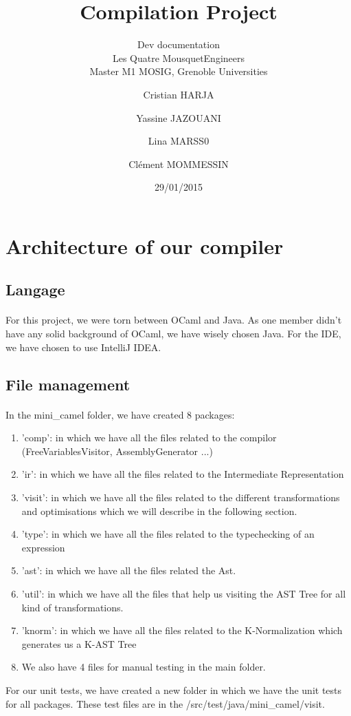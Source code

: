 \documentclass[a4paper,10pt]{article}
\title{Compilation Project}
\subtitle{Dev documentation\\ 
Les Quatre MousquetEngineers
\\Master M1 MOSIG, Grenoble Universities}
\author{Cristian HARJA \and Yassine JAZOUANI \and Lina MARSS0 
\and Cl\'{e}ment MOMMESSIN}
\date{29/01/2015}
\begin{document}


\maketitle


\section{Architecture of our compiler}
	\subsection{Langage}
		\paragraph{}
		For this project, we were torn between OCaml and Java. As one member
		didn't have any solid background of OCaml, we have wisely chosen 
		Java. For the IDE, we have chosen to use IntelliJ IDEA.
	\subsection{File management}
		\paragraph{}
		In the mini\_camel folder, we have created 8 packages:
		\begin{enumerate}
			\item 'comp': in which we have all the files related
			 to the compilor (FreeVariablesVisitor, AssemblyGenerator ...) 
			\item 'ir': in which we have all the files related to the
			 Intermediate Representation
			\item 'visit': in which we have all the files related to
			 the different transformations and optimisations which we will
			 describe in the following section. 
			\item 'type': in which we have all the files related to the
			 typechecking of an expression
			\item 'ast': in which we have all the files related the Ast.
			\item 'util': in which we have all the files that help us visiting
			the AST Tree for all kind of transformations.
			\item 'knorm': in which we have all the files related to the 
			K-Normalization which generates us a K-AST Tree
			\item We also have 4 files for manual testing in the main folder.
		\end{enumerate}
		For our unit tests, we have created a new folder in 
		which we have the unit tests for all packages. These test files
		are in the /src/test/java/mini\_camel/visit.
\end{document}
